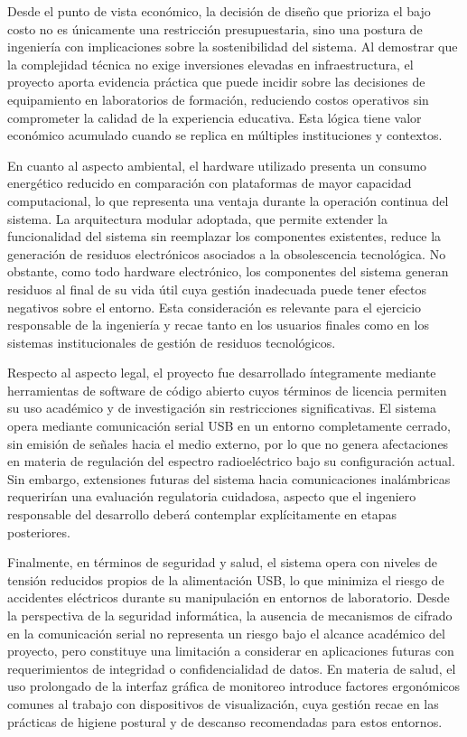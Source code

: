 Desde el punto de vista económico, la decisión de diseño que prioriza
el bajo costo no es únicamente una restricción presupuestaria, sino una
postura de ingeniería con implicaciones sobre la sostenibilidad del
sistema. Al demostrar que la complejidad técnica no exige inversiones
elevadas en infraestructura, el proyecto aporta evidencia práctica
que puede incidir sobre las decisiones de equipamiento en laboratorios
de formación, reduciendo costos operativos sin comprometer la calidad
de la experiencia educativa. Esta lógica tiene valor económico acumulado
cuando se replica en múltiples instituciones y contextos.

En cuanto al aspecto ambiental, el hardware utilizado presenta un
consumo energético reducido en comparación con plataformas de mayor
capacidad computacional, lo que representa una ventaja durante la
operación continua del sistema. La arquitectura modular adoptada, que
permite extender la funcionalidad del sistema sin reemplazar los
componentes existentes, reduce la generación de residuos electrónicos
asociados a la obsolescencia tecnológica. No obstante, como todo
hardware electrónico, los componentes del sistema generan residuos al
final de su vida útil cuya gestión inadecuada puede tener efectos
negativos sobre el entorno. Esta consideración es relevante para el
ejercicio responsable de la ingeniería y recae tanto en los usuarios
finales como en los sistemas institucionales de gestión de residuos
tecnológicos.

Respecto al aspecto legal, el proyecto fue desarrollado íntegramente
mediante herramientas de software de código abierto cuyos términos
de licencia permiten su uso académico y de investigación sin
restricciones significativas. El sistema opera mediante comunicación
serial USB en un entorno completamente cerrado, sin emisión de señales
hacia el medio externo, por lo que no genera afectaciones en materia
de regulación del espectro radioeléctrico bajo su configuración actual.
Sin embargo, extensiones futuras del sistema hacia comunicaciones
inalámbricas requerirían una evaluación regulatoria cuidadosa, aspecto
que el ingeniero responsable del desarrollo deberá contemplar
explícitamente en etapas posteriores.

Finalmente, en términos de seguridad y salud, el sistema opera con
niveles de tensión reducidos propios de la alimentación USB, lo que
minimiza el riesgo de accidentes eléctricos durante su manipulación
en entornos de laboratorio. Desde la perspectiva de la seguridad
informática, la ausencia de mecanismos de cifrado en la comunicación
serial no representa un riesgo bajo el alcance académico del proyecto,
pero constituye una limitación a considerar en aplicaciones futuras
con requerimientos de integridad o confidencialidad de datos. En
materia de salud, el uso prolongado de la interfaz gráfica de monitoreo
introduce factores ergonómicos comunes al trabajo con dispositivos de
visualización, cuya gestión recae en las prácticas de higiene postural
y de descanso recomendadas para estos entornos.

